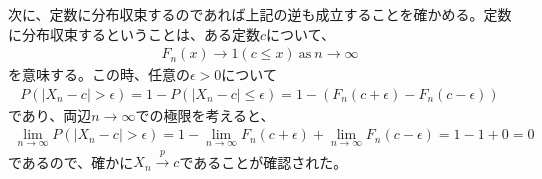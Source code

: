 \documentclass{article}
\begin{document}
次に、定数に分布収束するのであれば上記の逆も成立することを確かめる。定数に分布収束するということは、ある定数$c$について、
\begin{align*}
	F_n(x) \to 1\left( c \leq x \right)\ \text{as}\ n\to \infty
\end{align*}
を意味する。この時、任意の$\epsilon > 0$について
\begin{align*}
	P\left( |X_n - c| > \epsilon \right) = 1 - P\left( |X_n - c| \leq \epsilon \right) = 1- \left( F_n(c+\epsilon) - F_n(c-\epsilon) \right)
\end{align*}
であり、両辺$n\to \infty$での極限を考えると、
\begin{align*}
	\lim_{n\to \infty} P\left( |X_n - c| > \epsilon \right) = 1-\lim_{n\to \infty} F_n(c+\epsilon) + \lim_{n\to \infty} F_n(c-\epsilon) = 1-1+0 = 0
\end{align*}
であるので、確かに$X_n \xrightarrow{p} c$であることが確認された。
\end{document}
